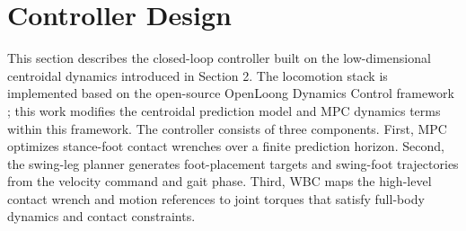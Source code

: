 \documentclass[5p,times]{elsarticle}
\begin{document}
\section{Controller Design}
This section describes the closed-loop controller built on the low-dimensional centroidal dynamics introduced in Section 2. The locomotion stack is implemented based on the open-source OpenLoong Dynamics Control framework \cite{refOpenLoong}; this work modifies the centroidal prediction model and MPC dynamics terms within this framework. The controller consists of three components. First, MPC optimizes stance-foot contact wrenches over a finite prediction horizon. Second, the swing-leg planner generates foot-placement targets and swing-foot trajectories from the velocity command and gait phase. Third, WBC maps the high-level contact wrench and motion references to joint torques that satisfy full-body dynamics and contact constraints.
\end{document}
